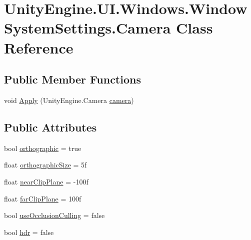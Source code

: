 \hypertarget{class_unity_engine_1_1_u_i_1_1_windows_1_1_window_system_settings_1_1_camera}{}\section{Unity\+Engine.\+U\+I.\+Windows.\+Window\+System\+Settings.\+Camera Class Reference}
\label{class_unity_engine_1_1_u_i_1_1_windows_1_1_window_system_settings_1_1_camera}
\subsection*{Public Member Functions}
\begin{DoxyCompactItemize}
\item 
void \hyperlink{class_unity_engine_1_1_u_i_1_1_windows_1_1_window_system_settings_1_1_camera_a5a846b61a864e3adbe99372af105d489}{Apply} (Unity\+Engine.\+Camera \hyperlink{class_unity_engine_1_1_u_i_1_1_windows_1_1_window_system_settings_a685b76f7373c278105c1d4550fae23fe}{camera})
\end{DoxyCompactItemize}
\subsection*{Public Attributes}
\begin{DoxyCompactItemize}
\item 
bool \hyperlink{class_unity_engine_1_1_u_i_1_1_windows_1_1_window_system_settings_1_1_camera_ad047c31e1cc1910871e28ac1086cf4f9}{orthographic} = true
\item 
float \hyperlink{class_unity_engine_1_1_u_i_1_1_windows_1_1_window_system_settings_1_1_camera_a309000594f140efc16187e783c78b6eb}{orthographic\+Size} = 5f
\item 
float \hyperlink{class_unity_engine_1_1_u_i_1_1_windows_1_1_window_system_settings_1_1_camera_aff626d632c59f43a48715787c01d6ebf}{near\+Clip\+Plane} = -\/100f
\item 
float \hyperlink{class_unity_engine_1_1_u_i_1_1_windows_1_1_window_system_settings_1_1_camera_a769f49bbdce2913b3d0456f488b4aa70}{far\+Clip\+Plane} = 100f
\item 
bool \hyperlink{class_unity_engine_1_1_u_i_1_1_windows_1_1_window_system_settings_1_1_camera_a925dac59062b3dcf973bf38638dda998}{use\+Occlusion\+Culling} = false
\item 
bool \hyperlink{class_unity_engine_1_1_u_i_1_1_windows_1_1_window_system_settings_1_1_camera_a2b8638007f7221b3c19d0965daf58253}{hdr} = false
\end{DoxyCompactItemize}


